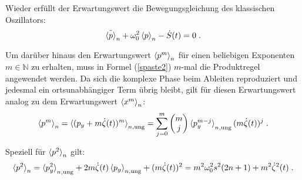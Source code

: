     Wieder erfüllt der Erwartungswert die Bewegungsgleichung des klassischen Oszillators:
    \begin{equation}
      \ddot{\braket{p}}_n + \omega_0^2\braket{p}_n - \dot{S}(t) = 0 \; .
    \end{equation}
\iffalse
    Wie an (\ref{spaste2}) zu sehen, ist es darüber hinaus einfach den Erwartungswert $\braket{p^m}_n$ für einen beliebigen Exponenten $m \in \mathbb{N}$ zu evaluieren.
    Wir können auf dem gleichen Weg die Produktregel anwenden, und erhalten wieder den ungetrieben Erwartungswert $\braket{p^m_y}_n$ aber diesmal zusätzlich die $m$-fache Anwendung des Operators auf die komplexe Phase, was wir sofort verallgemeinert aufschreiben können, da sich die komplexe Phase beim Ableiten nur reproduziert, weil immer der ortsunabhängige Term $m\dot{\zeta(t)}$ übrig bleibt.
    Es folgt:
    \begin{equation}
      \braket{p^m}_n = \braket{p^m_y}_{n,\text{ung}} + (m\dot{\zeta}(t))^m \; .
    \end{equation}
    Speziell für $m=2$ gilt:
    \begin{equation}
      \braket{p^2}_n = \braket{p^2_y}_{n,\text{ung}} + (m\dot{\zeta}(t))^2 = m^2\omega^2_0 s^2(2n+1) + m^2\dot{\zeta}^2(t) \; .
      \label{erwartungswert_p^2_einzelner}
    \end{equation}
\fi
    Um darüber hinaus den Erwartungswert $\braket{p^m}_n$ für einen beliebigen Exponenten $m \in \mathbb{N}$ zu erhalten, muss in Formel (\ref{spaste2}) $m$-mal die Produktregel angewendet werden.
    Da sich die komplexe Phase beim Ableiten reproduziert und jedesmal ein ortsunabhängiger Term übrig bleibt, gilt für diesen Erwartungswert analog zu dem Erwartungswert $\braket{x^m}_n$:
    \begin{equation}
        \braket{p^m}_n = \braket{(p_y+m\dot\zeta(t))^m}_{n,\text{ung}} = \sum_{j=0}^m\begin{pmatrix} m \\ j \\ \end{pmatrix} \braket{p_y^{m-j}}_{n,\text{ung}}(m\dot\zeta(t))^j \; .
        \label{erwartungswert_p^m_einzelner}
    \end{equation}

    Speziell für $\braket{p^2}_n$ gilt:
    \begin{equation}
      \braket{p^2}_n = \braket{p^2_y}_{n,\text{ung}} +2m\dot\zeta(t)\braket{p_y}_{n,\text{ung}}+(m\dot{\zeta}(t))^2 = m^2\omega^2_0 s^2(2n+1) + m^2\dot{\zeta}^2(t) \; .
      \label{erwartungswert_p^2_einzelner}
    \end{equation}



